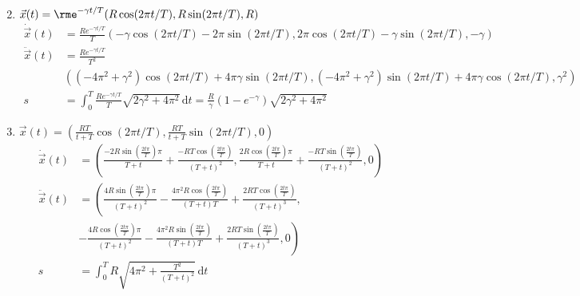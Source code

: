 \documentclass[11pt,answers]{exam}
\begin{document}
\begin{questions}
\begin{solution}
\begin{enumerate}
\begin{align*}
\end{align*}
\item $\vec{x}(t)=\rme^{-\gamma t/T}(R\cos(2\pi t/T),R\sin(2\pi t/T),R)$
\begin{align*}
\dot{\vec{x}}(t)&=\frac{Re^{-\gamma t/T}}{T}\left(
-\gamma\cos(2\pi t/T)-2\pi\sin(2\pi t/T),
2\pi\cos(2\pi t/T)-\gamma\sin(2\pi t/T),
-\gamma\right)
\\
\ddot{\vec{x}}(t)&=\frac{Re^{-\gamma t/T}}{T^2}
\\
&
\left(
(-4\pi^2+\gamma^2)\cos(2\pi t/T)+4\pi\gamma\sin(2\pi t/T),
(-4\pi^2+\gamma^2)\sin(2\pi t/T)+4\pi\gamma\cos(2\pi t/T),
\gamma^2\right)
\\
s&=\int_0^T\frac{Re^{-\gamma t/T}}{T}\sqrt{2\gamma^2+4\pi^2}\,\mathrm dt=\frac{R}{\gamma}\left(1-e^{-\gamma}\right)\sqrt{2\gamma^2+4\pi^2}
\end{align*}
\item $\vec{x}(t)=(\frac{RT}{t+T}\cos(2\pi t/T),\frac{RT}{t+T}\sin(2\pi t/T),0)$
\begin{align*}
	\dot{\vec{x}}(t)&=\left(\frac{ - 2 R \sin\left( \frac{2 t \pi_{}}{T} \right) \pi_{}}{T + t} + \frac{ - R T \cos\left( \frac{2 t \pi_{}}{T} \right)}{\left( T + t \right)^{2}}, \frac{2 R \cos\left( \frac{2 t \pi_{}}{T} \right) \pi_{}}{T + t} + \frac{ - R T \sin\left( \frac{2 t \pi_{}}{T} \right)}{\left( T + t \right)^{2}}, 0 \right)\\
	\ddot{\vec{x}}(t)&=\left(\frac{4 R \sin\left( \frac{2 t \pi_{}}{T} \right) \pi_{}}{\left( T + t \right)^{2}} - \frac{4 \pi_{}^{2} R \cos\left( \frac{2 t \pi_{}}{T} \right)}{\left( T + t \right) T} + \frac{ 2 R T \cos\left( \frac{2 t \pi_{}}{T} \right)}{\left( T + t \right)^{3}},\right.\\
	&\left.-\frac{4 R \cos\left( \frac{2 t \pi_{}}{T} \right) \pi_{}}{\left( T + t \right)^{2}} - \frac{4 \pi_{}^{2} R \sin\left( \frac{2 t \pi_{}}{T} \right)}{\left( T + t \right) T} + \frac{ 2 R T \sin\left( \frac{2 t \pi_{}}{T} \right)}{\left( T + t \right)^{3}}, 0 \right)\\
	s&=\int_0^TR\sqrt{4\pi^2+\frac{T^2}{(T+t)^2}}\,\mathrm dt
\end{align*}
\end{enumerate}
\end{solution}





\end{questions}
\end{document}

